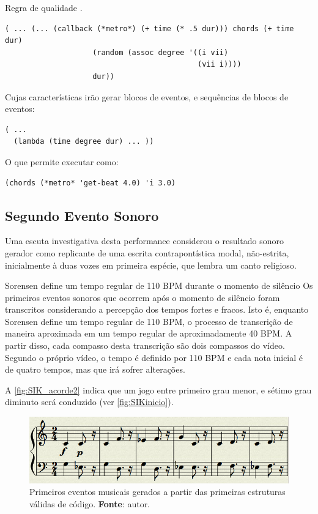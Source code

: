 \begin{example}{Regra de qualidade .}
\begin{verbatim}
( ... (... (callback (*metro*) (+ time (* .5 dur))) chords (+ time dur)
                    (random (assoc degree '((i vii)
                                            (vii i))))
                    dur))
\end{verbatim}

Cujas características irão gerar blocos de eventos, e sequências de blocos de eventos:

\begin{verbatim}
( ...
  (lambda (time degree dur) ... ))
\end{verbatim}

O que permite executar como:
\begin{verbatim}
(chords (*metro* 'get-beat 4.0) 'i 3.0)
\end{verbatim}
\end{example}




\subsection{Segundo Evento Sonoro}\label{sec:segundoevento}

Uma escuta investigativa desta performance considerou o resultado sonoro gerador como replicante de uma escrita contrapontística modal, não-estrita, inicialmente à duas vozes em primeira espécie, que lembra um canto religioso.

Sorensen define um tempo regular de 110 BPM durante o momento de silêncio Os primeiros eventos sonoros que ocorrem após o momento de silêncio foram transcritos considerando a percepção dos tempos fortes e fracos. Isto é, enquanto Sorensen define um tempo regular de 110 BPM, o processo de transcrição
de maneira aproximada em um tempo regular de aproximadamente 40 BPM. A partir disso, cada compasso desta transcrição são dois compassos do vídeo. Segundo o próprio vídeo, o tempo é definido por 110 BPM e cada nota inicial é de quatro tempos, mas que irá sofrer alterações. 

A \autoref{fig:SIK_acorde2} indica que um jogo entre primeiro grau menor, e sétimo grau diminuto será conduzido  (ver \autoref{fig:SIKinicio}).

\begin{figure}[!h]
  \centering
  \includegraphics[scale=0.5]{imagens/SIK_motivo.png}
  \caption{Primeiros eventos musicais gerados a partir das primeiras estruturas válidas de código. \textbf{Fonte}: autor.}
  \label{fig:SIKinicio}
\end{figure}

